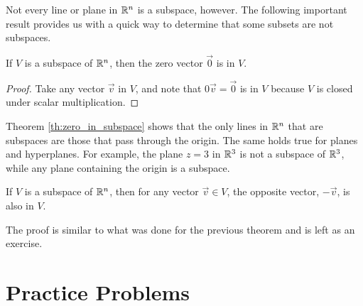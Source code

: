 \documentclass{ximera}
\begin{document}
Not every line or plane in $\mathbb{R}^n$ is a subspace, however.  The following important result provides us with a quick way to determine that some subsets are not subspaces.

\begin{theorem} \label{th:zero_in_subspace}
If $V$ is a subspace of $\mathbb{R}^n$, then the zero vector $\vec{0}$ is in $V$.
\end{theorem}

\begin{proof} 
Take any vector $\vec{v}$ in $V$, and note that $0 \vec{v} = \vec{0}$ is in $V$ because $V$ is closed under scalar multiplication.
\end{proof}



Theorem \ref{th:zero_in_subspace} shows that the only lines in $\mathbb{R}^n$ that are subspaces are those that pass through the origin.  The same holds true for planes and hyperplanes.  For example, the plane $z=3$ in $\mathbb{R}^3$ is not a subspace of $\mathbb{R}^3$, while any plane containing the origin is a subspace.

\begin{theorem} \label{opposite_in_subspace}
If $V$ is a subspace of $\mathbb{R}^n$, then for any vector $\vec{v} \in V$, the opposite vector, $-\vec{v}$, is also in $V$.
\end{theorem}

The proof is similar to what was done for the previous theorem and is left as an exercise.




\section*{Practice Problems}
\end{document}
